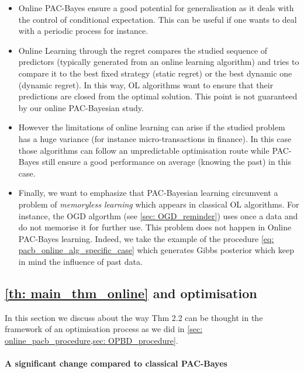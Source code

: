 \begin{noaddcontents}
\begin{itemize}
  \item Online PAC-Bayes ensure a good potential for generalisation as it deals with the control of conditional expectation. This can be useful if one wants to deal with a periodic process for instance.
  \item Online Learning through the regret compares the studied sequence of predictors (typically generated from an online learning algorithm) and tries to compare it to the best fixed strategy (static regret) or the best dynamic one (dynamic regret). In this way, OL algorithms want to ensure that their predictions are closed from the optimal solution. This point is not guaranteed by our online PAC-Bayesian study.
  \item However the limitations of online learning can arise if the studied problem has a huge variance (for instance micro-transactions in finance). In this case those algorithms can follow an unpredictable optimisation route while PAC-Bayes still ensure a good performance on average (knowing the past) in this case.
  \item Finally, we want to emphasize that PAC-Bayesian learning circumvent a problem of \emph{memoryless learning} which appears in classical OL algorithms. For instance, the OGD algorthm (see \cref{sec: OGD_reminder}) uses once a data and do not memorise it for further use. This problem does not happen in Online PAC-Bayes learning. Indeed, we take the example of the procedure \cref{eq: pacb_online_alg_specific_case} which generates Gibbs posterior which keep in mind the influence of past data.
\end{itemize}






\subsection{\cref{th: main_thm_online} and optimisation}
\label{sec: main_thm_and_optim}

In this section we discuss about the way Thm 2.2 can be thought in the framework of an optimisation process as we did in \cref{sec: online_pacb_procedure,sec: OPBD_procedure}.

\paragraph{A significant change compared to classical PAC-Bayes}


\end{noaddcontents}
